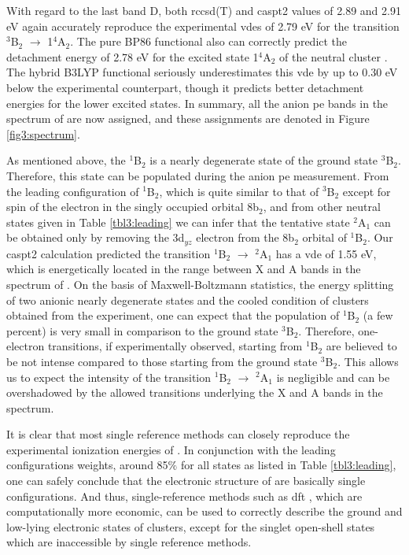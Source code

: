 \begin{refsection}
With regard to the last band D, both \acrshort{rccsd}(T) and \acrshort{caspt2} values of 2.89 and 2.91 eV again accurately reproduce the experimental \acrshort{vde}s of 2.79 eV for the transition $^3$B$_2$ $\longrightarrow$ 1$^4$A$_2$. The pure BP86 functional also can correctly predict the detachment energy of 2.78 eV for the excited state 1$^4$A$_2$ of the neutral cluster . The hybrid B3LYP functional seriously underestimates this \acrshort{vde} by up to 0.30 eV below the experimental counterpart, though it predicts better detachment energies for the lower excited states. In summary, all the anion \acrshort{pe} bands in the spectrum of  are now assigned, and these assignments are denoted in Figure \ref{fig3:spectrum}.




As mentioned above, the $^1$B$_2$ is a nearly degenerate state of the ground state $^3$B$_2$. Therefore, this state can be populated during the anion \acrshort{pe} measurement. From the leading configuration of $^1$B$_2$, which is quite similar to that of $^3$B$_2$ except for spin of the electron in the singly occupied orbital 8b$_2$, and from other neutral states given in Table \ref{tbl3:leading} we can infer that the tentative state $^2$A$_1$ can be obtained only by removing the 3d$_{yz}$ electron from the 8b$_2$ orbital of $^1$B$_2$. Our \acrshort{caspt2} calculation predicted the transition $^1$B$_2$ $\longrightarrow$ $^2$A$_1$ has a \acrshort{vde} of 1.55 eV, which is energetically located in the range between X and A bands in the spectrum of . On the basis of Maxwell-Boltzmann statistics, the energy splitting of two anionic nearly degenerate states and the cooled condition of  clusters obtained from the experiment,\cite{c3:14} one can expect that  the population of $^1$B$_2$ (a few percent) is very small in comparison to the ground state $^3$B$_2$. Therefore, one-electron transitions, if experimentally observed, starting from $^1$B$_2$ are believed to be not intense compared to those starting from the ground state $^3$B$_2$. This allows us to expect the intensity of the transition $^1$B$_2$ $\longrightarrow$ $^2$A$_1$ is negligible and can be overshadowed by the allowed transitions underlying the X and A bands in the spectrum. 





It is clear that most single reference methods can closely reproduce the experimental ionization energies of . In conjunction with the leading configurations weights, around 85$\%$ for all states as listed in Table \ref{tbl3:leading}, one can safely conclude that the electronic structure of  are basically single configurations. And thus, single-reference methods such as \acrshort{dft} , which are computationally more economic, can be used to correctly describe the ground and low-lying electronic states of  clusters, except for the singlet open-shell states which are inaccessible by single reference methods.





\end{refsection}

